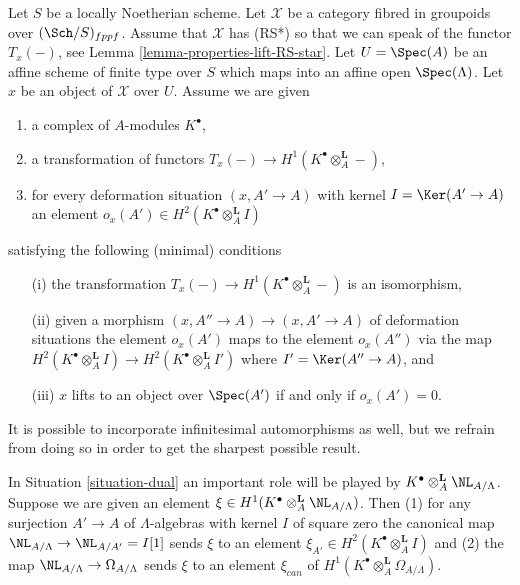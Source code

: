\begin{situation}
\label{situation-dual}
Let $S$ be a locally Noetherian scheme. Let $\mathcal{X}$ be a category
fibred in groupoids over $(\Sch/S)_{fppf}$. Assume that
$\mathcal{X}$ has (RS*) so that we can speak of the functor $T_x(-)$, see
Lemma \ref{lemma-properties-lift-RS-star}.
Let $U = \Spec(A)$ be an affine scheme of finite type over $S$ which maps
into an affine open $\Spec(\Lambda)$. Let $x$ be an object of $\mathcal{X}$
over $U$. Assume we are given
\begin{enumerate}
\item a complex of $A$-modules $K^\bullet$,
\item a transformation of functors
$T_x(-) \to H^1(K^\bullet \otimes_A^\mathbf{L} -)$,
\item for every deformation situation $(x, A' \to A)$ with kernel
$I = \Ker(A' \to A)$ an element
$o_x(A') \in H^2(K^\bullet \otimes_A^\mathbf{L} I)$
\end{enumerate}
satisfying the following (minimal) conditions
\begin{enumerate}
\item[(i)] the transformation
$T_x(-) \to H^1(K^\bullet \otimes_A^\mathbf{L} -)$
is an isomorphism,
\item[(ii)] given a morphism $(x, A'' \to A) \to (x, A' \to A)$ of deformation
situations the element $o_x(A')$ maps to the element $o_x(A'')$
via the map
$H^2(K^\bullet \otimes_A^\mathbf{L} I) \to
H^2(K^\bullet \otimes_A^\mathbf{L} I')$
where $I' = \Ker(A'' \to A)$, and
\item[(iii)] $x$ lifts to an object over $\Spec(A')$ if and only if
$o_x(A') = 0$.
\end{enumerate}
It is possible to incorporate infinitesimal automorphisms as well, but
we refrain from doing so in order to get the sharpest possible result.
\end{situation}

\noindent
In Situation \ref{situation-dual} an important role will be played by
$K^\bullet \otimes_A^\mathbf{L} \NL_{A/\Lambda}$. Suppose we are given an
element $\xi \in H^1(K^\bullet \otimes_A^\mathbf{L} \NL_{A/\Lambda})$.
Then (1) for any surjection $A' \to A$ of $\Lambda$-algebras with kernel
$I$ of square zero the canonical map $\NL_{A/\Lambda} \to \NL_{A/A'} = I[1]$
sends $\xi$ to an element $\xi_{A'} \in H^2(K^\bullet \otimes_A^\mathbf{L} I)$
and (2) the map $\NL_{A/\Lambda} \to \Omega_{A/\Lambda}$ sends
$\xi$ to an element $\xi_{can}$ of
$H^1(K^\bullet \otimes_A^\mathbf{L} \Omega_{A/\Lambda})$.

